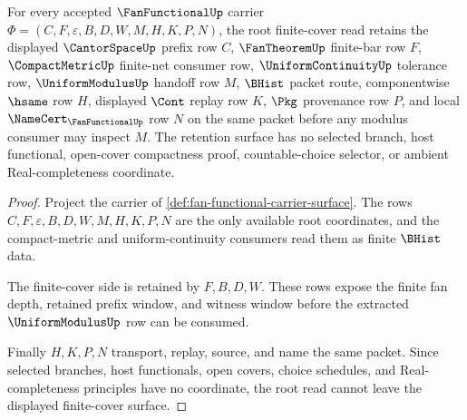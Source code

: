\begin{theorem}\label{thm:fan-functional-root-finite-cover-retention}
For every accepted $\FanFunctionalUp$ carrier $\Phi=(C,F,\varepsilon,B,D,W,M,H,K,P,N)$, the root finite-cover read retains the displayed $\CantorSpaceUp$ prefix row $C$, $\FanTheoremUp$ finite-bar row $F$, $\CompactMetricUp$ finite-net consumer row, $\UniformContinuityUp$ tolerance row, $\UniformModulusUp$ handoff row $M$, $\BHist$ packet route, componentwise $\hsame$ row $H$, displayed $\Cont$ replay row $K$, $\Pkg$ provenance row $P$, and local $\NameCert_{\FanFunctionalUp}$ row $N$ on the same packet before any modulus consumer may inspect $M$. The retention surface has no selected branch, host functional, open-cover compactness proof, countable-choice selector, or ambient Real-completeness coordinate.
\end{theorem}
\begin{proof}
Project the carrier of \autoref{def:fan-functional-carrier-surface}. The rows $C,F,\varepsilon,B,D,W,M,H,K,P,N$ are the only available root coordinates, and the compact-metric and uniform-continuity consumers read them as finite $\BHist$ data.

The finite-cover side is retained by $F,B,D,W$. These rows expose the finite fan depth, retained prefix window, and witness window before the extracted $\UniformModulusUp$ row can be consumed.

Finally $H,K,P,N$ transport, replay, source, and name the same packet. Since selected branches, host functionals, open covers, choice schedules, and Real-completeness principles have no coordinate, the root read cannot leave the displayed finite-cover surface.
\end{proof}

